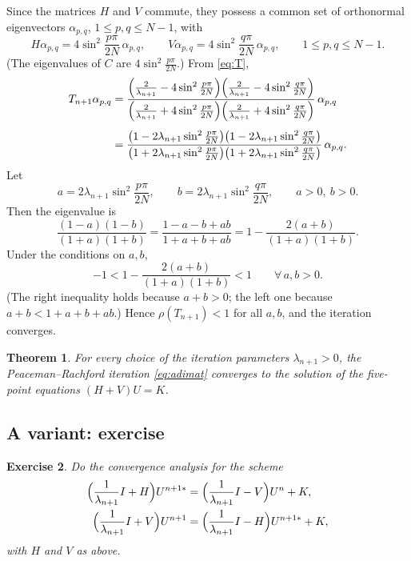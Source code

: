 \documentclass[11pt,a4paper]{article}
\numberwithin{equation}{section}
\theoremstyle{spacedplain}
\newtheorem{theorem}{Theorem}[section]
\theoremstyle{spaceddefinition}
\newtheorem{exercise}[theorem]{Exercise}
\theoremstyle{spacedremark}
\begin{document}
Since the matrices \(H\) and \(V\) commute, they possess a common set
of orthonormal eigenvectors \(\alpha_{p,q}\), \(1\le p,q\le N-1\),
with
\[
  H\alpha_{p,q}=4\sin^2\frac{p\pi}{2N}\,\alpha_{p,q},
  \qquad
  V\alpha_{p,q}=4\sin^2\frac{q\pi}{2N}\,\alpha_{p,q},
  \qquad 1\le p,q\le N-1 .
\]
(The eigenvalues of \(C\) are \(4\sin^2\frac{p\pi}{2N}\).)  From
\eqref{eq:T},
\begin{align*}
  T_{n+1}\alpha_{p,q}
  &=\frac{\Bigl(\frac2{\lambda_{n+1}}-4\sin^2\frac{p\pi}{2N}\Bigr)
          \Bigl(\frac2{\lambda_{n+1}}-4\sin^2\frac{q\pi}{2N}\Bigr)}
         {\Bigl(\frac2{\lambda_{n+1}}+4\sin^2\frac{p\pi}{2N}\Bigr)
          \Bigl(\frac2{\lambda_{n+1}}+4\sin^2\frac{q\pi}{2N}\Bigr)}
     \,\alpha_{p,q}\\[4pt]
  &=\frac{\bigl(1-2\lambda_{n+1}\sin^2\frac{p\pi}{2N}\bigr)
          \bigl(1-2\lambda_{n+1}\sin^2\frac{q\pi}{2N}\bigr)}
         {\bigl(1+2\lambda_{n+1}\sin^2\frac{p\pi}{2N}\bigr)
          \bigl(1+2\lambda_{n+1}\sin^2\frac{q\pi}{2N}\bigr)}
     \,\alpha_{p,q}.
\end{align*}
Let
\[
  a=2\lambda_{n+1}\sin^2\frac{p\pi}{2N},
  \qquad
  b=2\lambda_{n+1}\sin^2\frac{q\pi}{2N},
  \qquad a>0,\ b>0 .
\]
Then the eigenvalue is
\[
  \frac{(1-a)(1-b)}{(1+a)(1+b)}
  =\frac{1-a-b+ab}{1+a+b+ab}
  =1-\frac{2(a+b)}{(1+a)(1+b)} .
\]
Under the conditions on \(a,b\),
\[
  -1<1-\frac{2(a+b)}{(1+a)(1+b)}<1\qquad\forall\,a,b>0 .
\]
(The right inequality holds because \(a+b>0\); the left one because
\(a+b<1+a+b+ab\).)  Hence \(\rho(T_{n+1})<1\) for all \(a,b\), and the
iteration converges.

\begin{keybox}
\begin{theorem}
For every choice of the iteration parameters \(\lambda_{n+1}>0\), the
Peaceman--Rachford iteration \eqref{eq:adimat} converges to the
solution of the five-point equations \((H+V)U=K\).
\end{theorem}
\end{keybox}

\subsection{A variant: exercise}

\begin{exercise}
Do the convergence analysis for the scheme
\begin{align*}
  \Bigl(\frac1{\lambda_{n+1}}I+H\Bigr)U^{n+1*}
  &=\Bigl(\frac1{\lambda_{n+1}}I-V\Bigr)U^n+K,\\
  \Bigl(\frac1{\lambda_{n+1}}I+V\Bigr)U^{n+1}
  &=\Bigl(\frac1{\lambda_{n+1}}I-H\Bigr)U^{n+1*}+K,
\end{align*}
with \(H\) and \(V\) as above.
\end{exercise}
\end{document}
